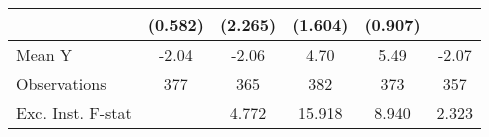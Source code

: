 {\begin{tabular}{l*{5}{c}}
            &     (0.582)         &     (2.265)         &     (1.604)         &     (0.907)         &                     \\
\midrule
Mean Y      &       -2.04         &       -2.06         &        4.70         &        5.49         &       -2.07         \\
Observations&         377         &         365         &         382         &         373         &         357         \\
Exc. Inst. F-stat&                     &       4.772         &      15.918         &       8.940         &       2.323         \\
\bottomrule
\end{tabular}
}
